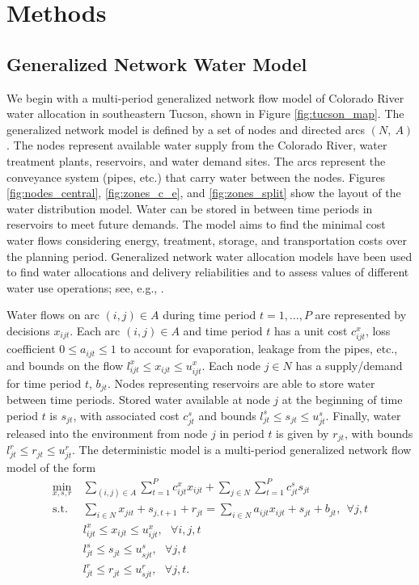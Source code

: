 \documentclass[12pt]{amsart}
\newcommand{\st}{\mbox{s.t.}}
\begin{document}
\section{Methods}
\subsection{Generalized Network Water Model} 
\label{sec:network_model}

We begin with a multi-period generalized network flow model of Colorado River water allocation in southeastern Tucson, shown in Figure \ref{fig:tucson_map}.
The generalized network model is defined by a set of nodes and directed arcs $(N,\: A)$.
The nodes represent available water supply from the Colorado River, water treatment plants, reservoirs, and water demand sites.
The arcs represent the conveyance system (pipes, etc.) that carry water between the nodes.
Figures \ref{fig:nodes_central}, \ref{fig:zones_c_e}, and \ref{fig:zones_split} show the layout of the water distribution model.
Water can be stored in between time periods in reservoirs to meet future demands. 
The model aims to find the minimal cost water flows considering energy, treatment, storage, and transportation costs over the planning period. 
Generalized network water allocation models have been used to find water allocations and delivery reliabilities and to assess values of different water use operations; see, e.g., \cite{draper_etal_03}. 

Water flows on arc $(i,j) \in A$ during time period $t = 1, \dots, P$ are represented by decisions $x_{ijt}$.
Each arc $(i,j) \in A$ and time period $t$ has a unit cost $c_{ijt}^x$, loss coefficient $0 \leq a_{ijt} \leq 1$ to account for evaporation, leakage from the pipes, etc., and bounds on the flow $l_{ijt}^x \leq x_{ijt} \leq u_{ijt}^x$.
Each node $j \in N$ has a supply/demand for time period $t$, $b_{jt}$.
Nodes representing reservoirs are able to store water between time periods.
Stored water available at node $j$ at the beginning of time period $t$ is $s_{jt}$, with associated cost $c_{jt}^s$ and bounds $l_{jt}^s \leq s_{jt} \leq u_{jt}^s$.
Finally, water released into the environment from node $j$ in period $t$ is given by $r_{jt}$, with bounds $l_{jt}^r \leq r_{jt} \leq u_{jt}^r$.
The deterministic model is a multi-period generalized network flow model of the form
\begin{align*}
	\min_{x,s,r} \ & \sum_{(i,j) \in A} \sum_{t=1}^P c_{ijt}^x x_{ijt} + \sum_{j \in N} \sum_{t=1}^P c_{jt}^s s_{jt}\\
	\st \ & \sum_{i \in N} x_{jit} + s_{j,t+1} + r_{jt} = \sum_{i \in N} a_{ijt} x_{ijt} + s_{jt} + b_{jt}, \ \ \forall j,t \\
	& l_{ijt}^x \leq x_{ijt} \leq u_{ijt}^x,\ \ \ \forall i,j,t \\
	& l_{jt}^s \leq s_{jt} \leq u_{sjt}^s, \ \ \ \forall j,t \\
	& l_{jt}^r \leq r_{jt} \leq u_{sjt}^r, \ \ \ \forall j,t.
\end{align*}
\end{document}
